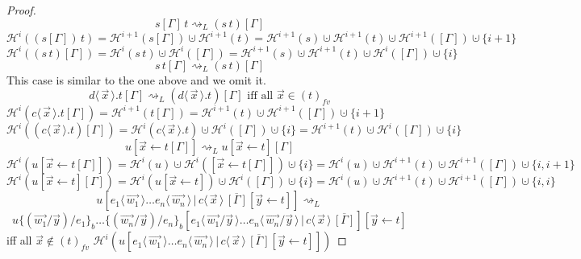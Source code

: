 \documentclass[a4paper,UKenglish,cleveref, autoref]{lipics-v2019}
\newcommand{\fv}[1]{(#1)_{fv}}
\newcommand{\set}[1]{ \{ #1 \} }
\newcommand{\app}[2]{#1 \, #2}
\newcommand{\fake}[3]{#1 \langle \, #2 \, \rangle . #3}
\newcommand{\share}[3]{#1 [#2 \leftarrow #3]}
\newcommand{\dist}[5]{#1 [ #2 \, \vert \, \fakedist{#4}{#5} \, #3 ]}
\newcommand{\fakedist}[2]{#1 \langle \, #2 \, \rangle}
\newcommand{\psub}[3]{#1 \{ #2 / #3 \}_{b}}
\newcommand{\height}[2]{\mathcal{H}^{#1}(#2)}
\begin{document}
\begin{proof}
$$\app{s[\Gamma]}{t} \rightsquigarrow_{L} (\app{s}{t})[\Gamma] $$
$\height{i}{\app{(s[\Gamma])}{t}} = \height{i + 1}{s[\Gamma]} \cupdot \height{i + 1}{t} = \height{i + 1}{s} \cupdot \height{i + 1}{t} \cupdot  \height{i + 1}{[\Gamma]} \cupdot \set{i+1}$
\newline
$\height{i}{(\app{s}{t})[\Gamma]} = \height{i}{\app{s}{t}} \cupdot \height{i}{[\Gamma]} = \height{i+ 1}{s} \cupdot \height{i + 1}{t} \cupdot  \height{i}{[\Gamma]} \cupdot \set{i}$
\newline
$$\app{s}{t[\Gamma]} \rightsquigarrow_{L} (\app{s}{t})[\Gamma] $$
This case is similar to the one above and we omit it.
\newline
$$\fake{d}{\vec{x}}{t[\Gamma]} \rightsquigarrow_{L} (\fake{d}{\vec{x}}{t})[\Gamma] \text{ iff all $\vec{x} \in \fv{t}$}$$
$\height{i}{\fake{c}{\vec{x}}{t[\Gamma]}} = \height{i+1}{t[\Gamma]} = \height{i + 1}{t} \cupdot \height{i + 1}{[\Gamma]} \cupdot \set{i + 1}$
\newline
$\height{i}{(\fake{c}{\vec{x}}{t})[\Gamma]} = \height{i}{\fake{c}{\vec{x}}{t}} \cupdot \height{i}{[\Gamma]} \cupdot \set{i} = \height{i + 1}{t} \cupdot \height{i}{[\Gamma]} \cupdot \set{i}$
\newline
$$\share{u}{\vec{x}}{t[\Gamma]} \rightsquigarrow_{L} \share{u}{\vec{x}}{t}[\Gamma] $$
$\height{i}{\share{u}{\vec{x}}{t[\Gamma]}} = \height{i}{u} \cupdot \height{i}{\share{}{\vec{x}}{t[\Gamma]}} \cupdot \set{i} = \height{i}{u} \cupdot \height{i + 1}{t} \cupdot \height{i + 1}{[\Gamma]} \cupdot \set{i, i + 1}$
\newline
$\height{i}{\share{u}{\vec{x}}{t}[\Gamma]} = \height{i}{\share{u}{\vec{x}}{t}} \cupdot \height{i}{[\Gamma]} \cupdot \set{i} = \height{i}{u} \cupdot \height{i + 1}{t} \cupdot \height{i + 1}{[\Gamma]} \cupdot \set{i, i}$
\newline
$$\dist{u}{\fakedist{e_{1}}{\vec{w_{1}}} \dots \fakedist{e_{n}}{\vec{w_{n}}}}{\overline{[\Gamma]} \share{}{\vec{y}}{t}}{c}{\vec{x}} \rightsquigarrow_{L}$$
$$\dist{\psub{ \psub{u}{(\vec{w_{1}} / \vec{y})}{e_{1}} \dots}{(\vec{w_{n}} / \vec{y})}{e_{n}}}{\fakedist{e_{1}}{\vec{w_{1}} / \vec{y}} \dots \fakedist{e_{n}}{\vec{w_{n}} / \vec{y}}}{\overline{[\Gamma]}}{c}{\vec{x}} \share{}{\vec{y}}{t}$$
iff all $\vec{x} \not\in \fv{t}$
\newline
$\height{i}{\dist{u}{\fakedist{e_{1}}{\vec{w_{1}}} \dots \fakedist{e_{n}}{\vec{w_{n}}}}{\overline{[\Gamma]} \share{}{\vec{y}}{t}}{c}{\vec{x}}}$
\newline

\end{proof}
\end{document}
